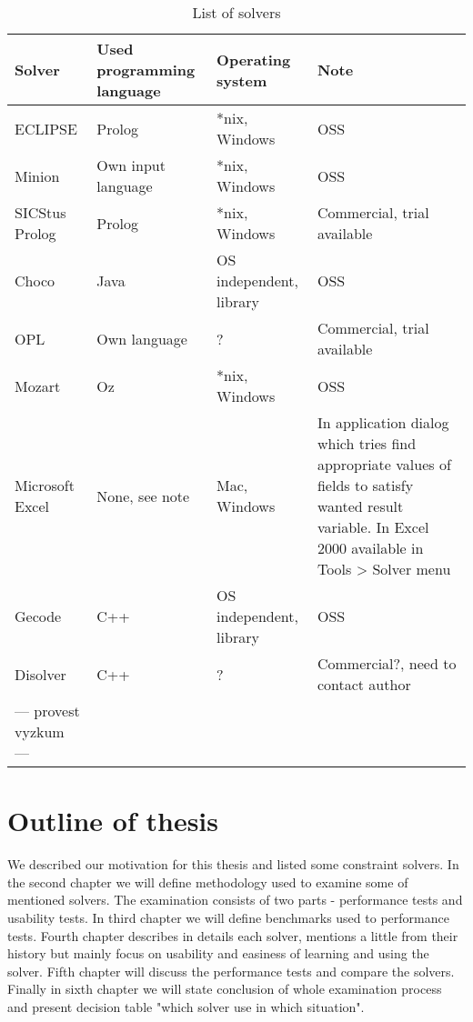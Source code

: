 \begin{table}[ht]
\caption{\label{list-solvers}List of solvers}
\begin{center}
\begin{tabular}{|l|l|l|l|}
\hline Solver &	Used programming language &	Operating system &	Note \\
\hline ECLIPSE &	Prolog & *nix, Windows & OSS \\
\hline Minion & Own input language & *nix, Windows & OSS \\
\hline SICStus Prolog & Prolog & *nix, Windows & Commercial, trial available \\
\hline Choco &	Java & OS independent, library & OSS \\
\hline OPL &	Own language & ?	&	Commercial, trial available \\
\hline Mozart &	Oz &	*nix, Windows &	OSS \\
\hline Microsoft Excel &	None, see note &	Mac, Windows &	In application dialog which tries find  appropriate values of fields to satisfy wanted result variable. In Excel 2000 available in Tools > Solver menu \\
\hline Gecode &	C++ &	OS independent, library &	OSS \\
\hline Disolver &	C++ &	? &	Commercial?, need to contact author \\
\hline --- provest vyzkum ---	& & & \\
\hline
\end{tabular}
\end{center}
\end{table}
		

\section{Outline of thesis}
We described our motivation for this thesis and listed some constraint solvers. In the second chapter we will define methodology used to examine some of mentioned solvers. The examination consists of two parts - performance tests and usability tests. In third chapter we will define benchmarks used to performance tests. Fourth chapter describes in details each solver, mentions a little from their history but mainly focus on usability and easiness of learning and using the solver. Fifth chapter will discuss the performance tests and compare the solvers. Finally in sixth chapter we will state conclusion of whole examination process and present decision table "which solver use in which situation".

